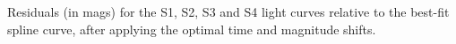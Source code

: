 \label{fig:SplineFitResiduals}
Residuals (in mags) for the S1, S2, S3 and S4 light curves relative to the best-fit spline curve, after applying the optimal time and magnitude shifts.